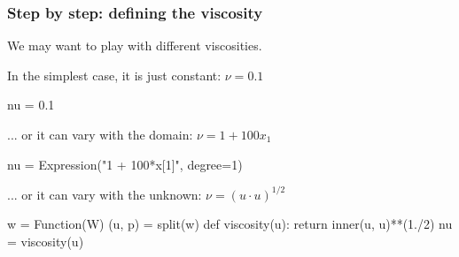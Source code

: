 \begin{frame}[fragile]
  \frametitle{Step by step: defining the viscosity}

We may want to play with different viscosities.

\bigskip

In the simplest case, it is just constant: $\nu = 0.1$
\vspace{-1em}
  \begin{python}
nu = 0.1
  \end{python}

... or it can vary with the domain: $\nu = 1 + 100 x_1$
\vspace{-1em}
  \begin{python}
nu = Expression("1 + 100*x[1]", degree=1)
  \end{python}

... or it can vary with the unknown: $\nu = (u \cdot u)^{1/2}$
\vspace{-1em}
  \begin{python}
w = Function(W)
(u, p) = split(w)
def viscosity(u):
    return inner(u, u)**(1./2)
nu = viscosity(u)
  \end{python}

\end{frame}

